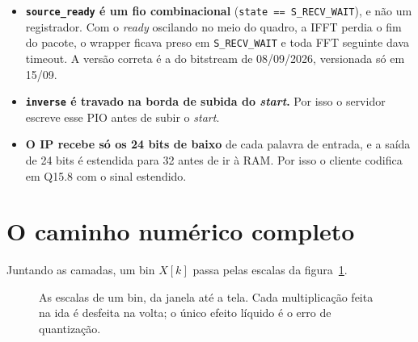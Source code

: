 \documentclass[11pt,a4paper,oneside]{article}
\begin{document}
\begin{itemize}
\item \textbf{\texttt{source\_ready} é um fio combinacional}
  (\texttt{state == S\_RECV\_WAIT}), e não um registrador. Com o \emph{ready}
  oscilando no meio do quadro, a IFFT perdia o fim do pacote, o wrapper ficava
  preso em \texttt{S\_RECV\_WAIT} e toda FFT seguinte dava timeout. A versão
  correta é a do bitstream de 08/09/2026, versionada só em 15/09.
\item \textbf{\texttt{inverse} é travado na borda de subida do \emph{start}.}
  Por isso o servidor escreve esse PIO antes de subir o \emph{start}.
\item \textbf{O IP recebe só os 24 bits de baixo} de cada palavra de entrada, e
  a saída de 24 bits é estendida para 32 antes de ir à RAM. Por isso o cliente
  codifica em Q15.8 com o sinal estendido.
\end{itemize}

\section{O caminho numérico completo}
\label{sec:escalas}

Juntando as camadas, um bin $X[k]$ passa pelas escalas da
figura~\ref{fig:escalas}.

\begin{figure}[htbp]
\centering
{}
\caption{As escalas de um bin, da janela até a tela. Cada multiplicação feita
na ida é desfeita na volta; o único efeito líquido é o erro de quantização.}
\label{fig:escalas}
\end{figure}
\end{document}
